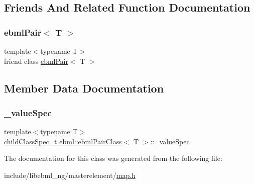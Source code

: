 \subsection{Friends And Related Function Documentation}
\mbox{\label{classebml_1_1ebmlPairClass_ad1db4b5395f31070d1be2d251ee85e02}} 
\subsubsection{\texorpdfstring{ebml\+Pair$<$ T $>$}{ebmlPair< T >}}
{\footnotesize\ttfamily template$<$typename T$>$ \\
friend class \mbox{\hyperlink{classebml_1_1ebmlPair}{ebml\+Pair}}$<$ T $>$\hspace{0.3cm}{\ttfamily [friend]}}



\subsection{Member Data Documentation}
\mbox{\label{classebml_1_1ebmlPairClass_ad560a3a9e6b47eb8e51e707de59df919}} 
\subsubsection{\texorpdfstring{\+\_\+value\+Spec}{\_valueSpec}}
{\footnotesize\ttfamily template$<$typename T$>$ \\
\mbox{\hyperlink{classebml_1_1childClassSpec__t}{child\+Class\+Spec\+\_\+t}} \mbox{\hyperlink{classebml_1_1ebmlPairClass}{ebml\+::ebml\+Pair\+Class}}$<$ T $>$\+::\+\_\+value\+Spec\hspace{0.3cm}{\ttfamily [protected]}}



The documentation for this class was generated from the following file\+:\begin{DoxyCompactItemize}
\item 
include/libebml\+\_\+ng/masterelement/\mbox{\hyperlink{map_8h}{map.\+h}}\end{DoxyCompactItemize}
